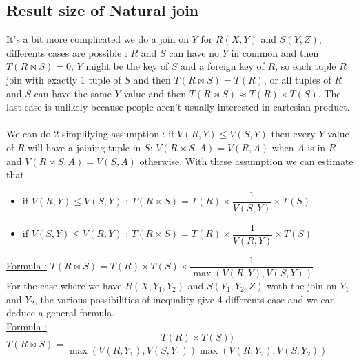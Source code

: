 \documentclass[12pt,a4paper]{article}
\begin{document}
\subsection{Result size of Natural join}
It's a bit more complicated we do a join on $Y$ for $R(X,Y)$ and $S(Y,Z)$, differents cases are possible : $R$ and $S$ can have no $Y$ in common and then $T(R \Join S) = 0$, $Y$ might be the key of $S$ and a foreign key of $R$, so each tuple $R$ join with exactly 1 tuple of $S$ and then $T(R \Join S) = T(R)$, or all tuples of $R$ and $S$ can have the same $Y$-value and then $T(R \Join S) \approx T(R) \times T(S)$. The last case is unlikely because people aren't usually interested in cartesian product.\\
\\
We can do 2 simplifying assumption : if $V(R,Y) \leq V(S,Y)$ then every $Y$-value of $R$ will have a joining tuple in $S$; $V(R \Join S,A) = V(R,A)$ when $A$ is in $R$ and $V(R \Join S,A) = V(S,A)$ otherwise. With these assumption we can estimate that
\begin{itemize}
\item if $V(R,Y) \leq V(S,Y)$ : $T(R \Join S) = T(R) \times \dfrac{1}{V(S,Y)} \times T(S)$
\item if $V(S,Y) \leq V(R,Y)$ : $T(R \Join S) = T(R) \times \dfrac{1}{V(R,Y)} \times T(S)$
\end{itemize}
\underline{Formula :} $T(R \Join S) = T(R) \times T(S) \times \dfrac{1}{\max(V(R,Y),V(S,Y))}$\\
For the case where we have $R(X,Y_1,Y_2)$ and $S(Y_1,Y_2,Z)$ woth the join on $Y_1$ and $Y_2$, the various possibilities of inequality give 4 differents case and we can deduce a general formula.\\
\underline{Formula :} $T(R \Join S)  = \dfrac{T(R) \times T(S)) }{\max(V(R,Y_1),V(S,Y_1))\max(V(R,Y_2),V(S,Y_2))}$
\end{document}
